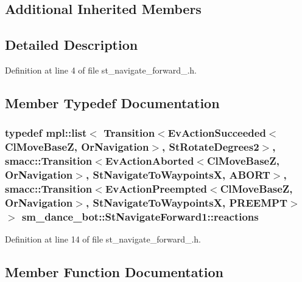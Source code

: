 \subsection*{Additional Inherited Members}


\subsection{Detailed Description}


Definition at line 4 of file st\+\_\+navigate\+\_\+forward\+\_.\+h.



\subsection{Member Typedef Documentation}
\subsubsection[{\texorpdfstring{reactions}{reactions}}]{\setlength{\rightskip}{0pt plus 5cm}typedef mpl\+::list$<$ Transition$<$Ev\+Action\+Succeeded$<${\bf Cl\+Move\+BaseZ}, {\bf Or\+Navigation}$>$, {\bf St\+Rotate\+Degrees2}$>$, {\bf smacc\+::\+Transition}$<$Ev\+Action\+Aborted$<${\bf Cl\+Move\+BaseZ}, {\bf Or\+Navigation}$>$, {\bf St\+Navigate\+To\+WaypointsX}, {\bf A\+B\+O\+RT}$>$, {\bf smacc\+::\+Transition}$<$Ev\+Action\+Preempted$<${\bf Cl\+Move\+BaseZ}, {\bf Or\+Navigation}$>$, {\bf St\+Navigate\+To\+WaypointsX}, {\bf P\+R\+E\+E\+M\+PT}$>$ $>$ {\bf sm\+\_\+dance\+\_\+bot\+::\+St\+Navigate\+Forward1\+::reactions}}\hypertarget{structsm__dance__bot_1_1StNavigateForward1_ae577e9eea9fdb0a77c3ca7ed21a8f295}{}\label{structsm__dance__bot_1_1StNavigateForward1_ae577e9eea9fdb0a77c3ca7ed21a8f295}


Definition at line 14 of file st\+\_\+navigate\+\_\+forward\+\_.\+h.



\subsection{Member Function Documentation}
